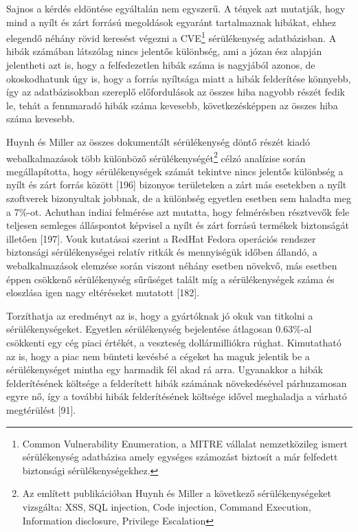 \documentclass[12pt,magyar,a4paper,oneside]{scrreprt}
\begin{document}
Sajnos a kérdés eldöntése egyáltalán nem egyszerű. A tények azt
mutatják, hogy mind a nyílt és zárt forrású megoldások egyaránt
tartalmaznak hibákat, ehhez elegendő néhány rövid keresést végezni a
CVE\footnote{Common Vulnerability Enumeration, a MITRE vállalat
  nemzetközileg ismert sérülékenység adatbázisa amely egységes számozást
  biztosít a már felfedett biztonsági sérülékenységekhez.} sérülékenység
adatbázisban. A hibák számában látszólag nincs jelentős különbség, ami a
józan ész alapján jelentheti azt is, hogy a felfedezetlen hibák száma is
nagyjából azonos, de okoskodhatunk úgy is, hogy a forrás nyíltsága miatt
a hibák felderítése könnyebb, így az adatbázisokban szereplő
előfordulások az összes hiba nagyobb részét fedik le, tehát a fennmaradó
hibák száma kevesebb, következésképpen az összes hiba száma kevesebb.

Huynh és Miller az összes dokumentált sérülékenység döntő részét kiadó
webalkalmazások több különböző sérülékenységét\footnote{Az említett
  publikációban Huynh és Miller a következő sérülékenységeket vizsgálta:
  XSS, SQL injection, Code injection, Command Execution, Information
  disclosure, Privilege Escalation} célzó analízise során
megállapította, hogy sérülékenységek számát tekintve nincs jelentős
különbség a nyílt és zárt forrás között {[}196{]} bizonyos területeken a
zárt más esetekben a nyílt szoftverek bizonyultak jobbnak, de a
különbség egyetlen esetben sem haladta meg a 7\%-ot. Achuthan indiai
felmérése azt mutatta, hogy felmérésben résztvevők fele teljesen
semleges álláspontot képvisel a nyílt és zárt forrású termékek
biztonságát illetően {[}197{]}. Vouk kutatásai szerint a RedHat Fedora
operációs rendszer biztonsági sérülékenységei relatív ritkák és
mennyiségük időben állandó, a webalkalmazások elemzése során viszont
néhány esetben növekvő, más esetben éppen csökkenő sérülékenység
sűrűséget talált míg a sérülékenységek száma és eloszlása igen nagy
eltéréseket mutatott {[}182{]}.

Torzíthatja az eredményt az is, hogy a gyártóknak jó okuk van titkolni a
sérülékenységeket. Egyetlen sérülékenység bejelentése átlagosan
0.63\%-al csökkenti egy cég piaci értékét, a veszteség dollármilliókra
rúghat. Kimutatható az is, hogy a piac nem bünteti kevésbé a cégeket ha
maguk jelentik be a sérülékenységet mintha egy harmadik fél akad rá
arra. Ugyanakkor a hibák felderítésének költsége a felderített hibák
számának növekedésével párhuzamosan egyre nő, így a további hibák
felderítésének költsége idővel meghaladja a várható megtérülést
{[}91{]}.
\end{document}
